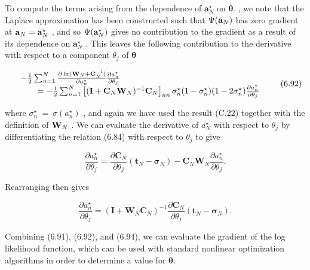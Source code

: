 \documentclass[
  10
]{article}
\begin{document}
To compute the terms arising from the dependence of
\(\mathbf { a } _ { N } ^ { \star }\) on \(\pmb \theta _ { : }\) , we
note that the Laplace approximation has been constructed such that
\(\Psi ( { \bf a } _ { N } )\) has zero gradient at
\({ \bf a } _ { N } = { \bf a } _ { N } ^ { \star }\) , and so
\(\Psi ( { \bf a } _ { N } ^ { \star } )\) gives no contribution to the
gradient as a result of its dependence on
\(\mathbf { a } _ { N } ^ { \star }\) . This leaves the following
contribution to the derivative with respect to a component
\(\theta _ { j }\) of \(\pmb \theta\)

\[
\begin{array}{r l} & {- \frac {1}{2} \sum_ {n = 1} ^ {N} \frac {\partial \ln | \mathbf {W} _ {N} + \mathbf {C} _ {N} ^ {- 1} |}{\partial a _ {n} ^ {\star}} \frac {\partial a _ {n} ^ {\star}}{\partial \theta_ {j}}} \\ & {\qquad = - \frac {1}{2} \sum_ {n = 1} ^ {N} \left[ (\mathbf {I} + \mathbf {C} _ {N} \mathbf {W} _ {N}) ^ {- 1} \mathbf {C} _ {N} \right] _ {n n} \sigma_ {n} ^ {\star} (1 - \sigma_ {n} ^ {\star}) (1 - 2 \sigma_ {n} ^ {\star}) \frac {\partial a _ {n} ^ {\star}}{\partial \theta_ {j}}} \end{array}\tag{6.92}
\]

where
\(\sigma _ { n } ^ { \star } ~ = ~ \sigma ( a _ { n } ^ { \star } )\) ,
and again we have used the result (C.22) together with the definition of
\({ \bf W } _ { N }\) . We can evaluate the derivative of
\(a _ { N } ^ { \star }\) with respect to \(\theta _ { j }\) by
differentiating the relation (6.84) with respect to \(\theta _ { j }\)
to give

\[
\frac {\partial a _ {n} ^ {\star}}{\partial \theta_ {j}} = \frac {\partial \mathbf {C} _ {N}}{\partial \theta_ {j}} (\mathbf {t} _ {N} - \boldsymbol {\sigma} _ {N}) - \mathbf {C} _ {N} \mathbf {W} _ {N} \frac {\partial a _ {n} ^ {\star}}{\partial \theta_ {j}}.\tag{6.93}
\]

Rearranging then gives

\[
\frac {\partial a _ {n} ^ {\star}}{\partial \theta_ {j}} = (\mathbf {I} + \mathbf {W} _ {N} \mathbf {C} _ {N}) ^ {- 1} \frac {\partial \mathbf {C} _ {N}}{\partial \theta_ {j}} (\mathbf {t} _ {N} - \boldsymbol {\sigma} _ {N}).\tag{6.94}
\]

Combining (6.91), (6.92), and (6.94), we can evaluate the gradient of
the log likelihood function, which can be used with standard nonlinear
optimization algorithms in order to determine a value for
\(\pmb { \theta } .\)
\end{document}
